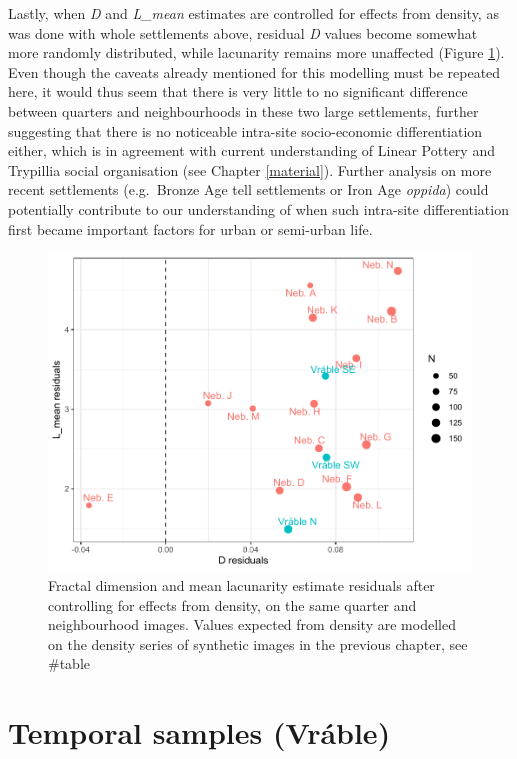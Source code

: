 \documentclass[
  12pt,
]{book}
\begin{document}
Lastly, when \emph{D} and \emph{L\_mean} estimates are controlled for effects from density, as was done with whole settlements above, residual \emph{D} values become somewhat more randomly distributed, while lacunarity remains more unaffected (Figure \ref{fig:09-quart-resid}). Even though the caveats already mentioned for this modelling must be repeated here, it would thus seem that there is very little to no significant difference between quarters and neighbourhoods in these two large settlements, further suggesting that there is no noticeable intra-site socio-economic differentiation either, which is in agreement with current understanding of Linear Pottery and Trypillia social organisation (see Chapter \ref{material}). Further analysis on more recent settlements (e.g.~Bronze Age tell settlements or Iron Age \emph{oppida}) could potentially contribute to our understanding of when such intra-site differentiation first became important factors for urban or semi-urban life.



\begin{figure}

{\centering \includegraphics[width=0.9\linewidth]{bookdown-demo_files/figure-latex/09-quart-resid-1} 

}

\caption{Fractal dimension and mean lacunarity estimate residuals after controlling for effects from density, on the same quarter and neighbourhood images. Values expected from density are modelled on the density series of synthetic images in the previous chapter, see \#table}\label{fig:09-quart-resid}
\end{figure}

\hypertarget{temporal-samples-vruxe1ble-1}{%
\section{Temporal samples (Vráble)}\label{temporal-samples-vruxe1ble-1}}
\end{document}
